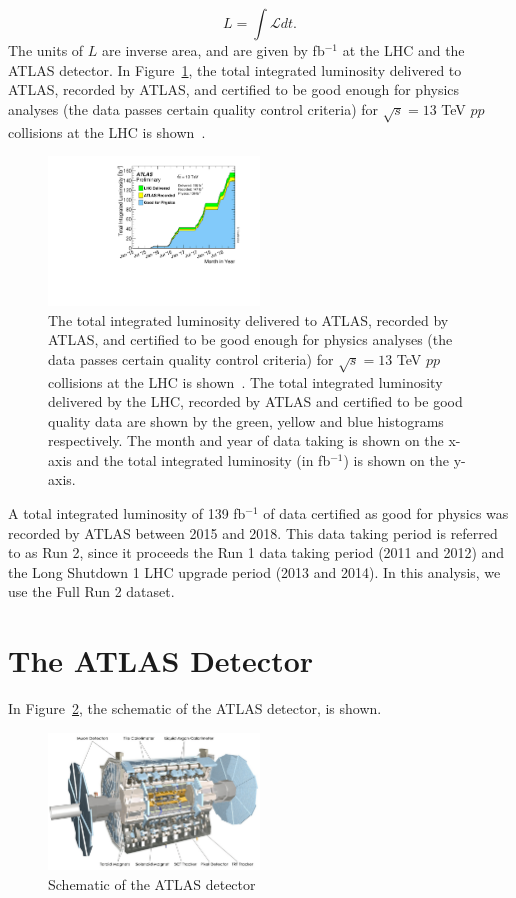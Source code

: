 \begin{equation}
L = \int \mathcal{L} dt.
\end{equation}
The units of $L$ are inverse area, and are given by fb$^{-1}$ at the LHC and the ATLAS detector. In Figure~\ref{fig:lhc-lumi}, the total integrated luminosity delivered to ATLAS, recorded by ATLAS, and certified to be good enough for physics analyses (the data passes certain quality control criteria) for $\sqrt{s} = 13$ TeV $pp$ collisions at the LHC is shown~\cite{LHC-lumi}. 

\begin{figure}[h!]
 \includegraphics[width=0.5\textwidth]{figures/theoryFigs/lhc_lumi.pdf}
 \centering
\caption{The total integrated luminosity delivered to ATLAS, recorded by ATLAS, and certified to be good enough for physics analyses (the data passes certain quality control criteria) for $\sqrt{s} = 13$ TeV $pp$ collisions at the LHC is shown~\cite{LHC-lumi}. The total integrated luminosity delivered by the LHC, recorded by ATLAS and certified to be good quality data are shown by the green, yellow and blue histograms respectively. The month and year of data taking is shown on the x-axis and the total integrated luminosity (in fb$^{-1}$) is shown on the y-axis.}
\label{fig:lhc-lumi}
\end{figure}

A total integrated luminosity of 139 fb$^{-1}$ of data certified as good for physics was recorded by ATLAS between 2015 and 2018. This data taking period is referred to as Run 2, since it proceeds the Run 1 data taking period (2011 and 2012) and the Long Shutdown 1 LHC upgrade period (2013 and 2014). In this analysis, we use the Full Run 2 dataset.


\section{The ATLAS Detector}
In Figure~\ref{fig:atlas-detector}, the schematic of the ATLAS detector, is shown.

\begin{figure}[h!]
 \includegraphics[width=0.5\textwidth]{figures/theoryFigs/atlasDetector.png}
 \centering
\caption{Schematic of the ATLAS detector~\cite{Collaboration_2008}}
\label{fig:atlas-detector}
\end{figure}

